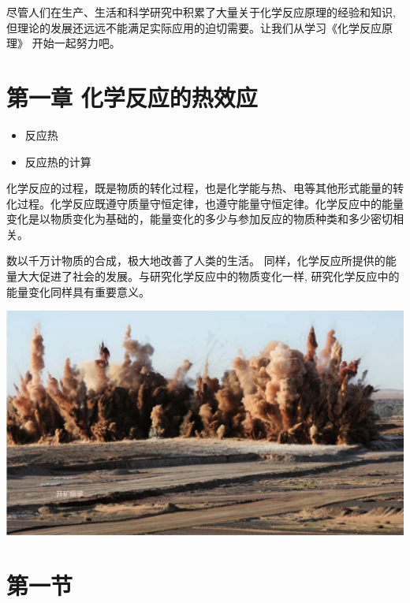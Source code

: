 \documentclass[10pt]{article}
\begin{document}
尽管人们在生产、生活和科学研究中积累了大量关于化学反应原理的经验和知识, 但理论的发展还远远不能满足实际应用的迫切需要。让我们从学习《化学反应原理》 开始一起努力吧。

\section*{第一章 化学反应的热效应}

\begin{mdframed}

\begin{itemize}
\item 反应热
\end{itemize}

\begin{itemize}
\item 反应热的计算
\end{itemize}

\end{mdframed}

化学反应的过程，既是物质的转化过程，也是化学能与热、电等其他形式能量的转化过程。化学反应既遵守质量守恒定律，也遵守能量守恒定律。化学反应中的能量变化是以物质变化为基础的，能量变化的多少与参加反应的物质种类和多少密切相关。

数以千万计物质的合成，极大地改善了人类的生活。 同样，化学反应所提供的能量大大促进了社会的发展。与研究化学反应中的物质变化一样, 研究化学反应中的能量变化同样具有重要意义。

\begin{center}
\includegraphics[max width=1.0\textwidth]{images/0190da9d-8bfd-732f-bc2c-0b21d0f13b91_8_671217.jpg}
\end{center}

\section*{第一节}
\end{document}
